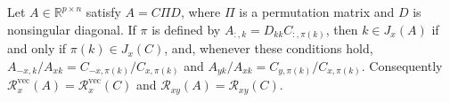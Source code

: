 Let \(A\in\mathbb R^{p\times n}\) satisfy \(A=C\Pi D\), where \(\Pi\) is a permutation matrix and \(D\) is nonsingular diagonal. If \(\pi\) is defined by \(A_{:,k}=D_{kk}C_{:,\pi(k)}\), then \(k\in J_x(A)\) if and only if \(\pi(k)\in J_x(C)\), and, whenever these conditions hold, \(A_{-x,k}/A_{xk}=C_{-x,\pi(k)}/C_{x,\pi(k)}\) and \(A_{yk}/A_{xk}=C_{y,\pi(k)}/C_{x,\pi(k)}\). Consequently \(\mathcal R_x^{\mathrm{vec}}(A)=\mathcal R_x^{\mathrm{vec}}(C)\) and \(\mathcal R_{xy}(A)=\mathcal R_{xy}(C)\).